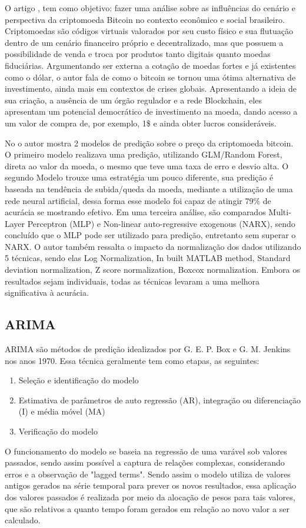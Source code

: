 \documentclass[sigplan,screen]{acmart}
\begin{document}
O artigo \cite{dos2021cenario}, tem como objetivo: fazer uma análise sobre as influências do cenário e perspectiva da criptomoeda Bitcoin no contexto econômico e social brasileiro.
Criptomoedas são códigos virtuais valorados por seu custo físico e sua flutuação dentro de um cenário financeiro próprio e decentralizado, mas que possuem a possibilidade de venda e troca por produtos tanto digitais quanto moedas fiduciárias.
Argumentando ser externa a cotação de moedas fortes e já existentes como o dólar, o autor fala de como o bitcoin se tornou uma ótima alternativa de investimento, ainda mais em contextos de crises globais.
Apresentando a ideia de sua criação, a ausência de um órgão regulador e a rede Blockchain, eles apresentam um potencial democrático de investimento na moeda, dando acesso a um valor de compra de, por exemplo, 1\$ e ainda obter lucros consideráveis.

No \cite{8323676} o autor mostra 2 modelos de predição sobre o preço da criptomoeda bitcoin.
O primeiro modelo realizava uma predição, utilizando GLM/Random Forest, direta ao valor da moeda, o mesmo que teve uma taxa de erro e desvio alta.
O segundo Modelo trouxe uma estratégia um pouco diferente, sua predição é baseada na tendência de subida/queda da moeda, mediante a utilização de uma rede neural artificial, dessa forma esse modelo foi capaz de atingir 79\% de acurácia se mostrando efetivo.
Em uma terceira análise, são comparados Multi-Layer Perceptron (MLP) e Non-linear auto-regressive exogenous (NARX), sendo concluído que o MLP pode ser utilizado para predição, entretanto sem superar o NARX.
O autor também ressalta o impacto da normalização dos dados utilizando 5 técnicas, sendo elas Log Normalization, In built MATLAB method, Standard deviation normalization, Z score normalization, Boxcox normalization.
Embora os resultados sejam individuais, todas as técnicas levaram a uma melhora significativa à acurácia.   
\subsection{ARIMA}
ARIMA são métodos de predição idealizados por G. E. P. Box e G. M. Jenkins nos anos 1970.
Essa técnica geralmente tem como etapas, as seguintes:
\begin{enumerate}
  \item Seleção e identificação do modelo
  \item Estimativa de parâmetros de auto regressão (AR), integração ou diferenciação (I) e média móvel (MA)
  \item Verificação do modelo
\end{enumerate}
O funcionamento do modelo se baseia na regressão de uma varável sob valores passados, sendo assim possível a captura de relações complexas, considerando erros e a observação de "lagged terms". Sendo assim o modelo utiliza de valores antigos gerados na série temporal
para prever os novos resultados, essa aplicação dos valores passados é realizada por meio da alocação de pesos para tais valores, que são relativos a quanto tempo foram gerados em relação ao novo valor a ser calculado.
\end{document}
